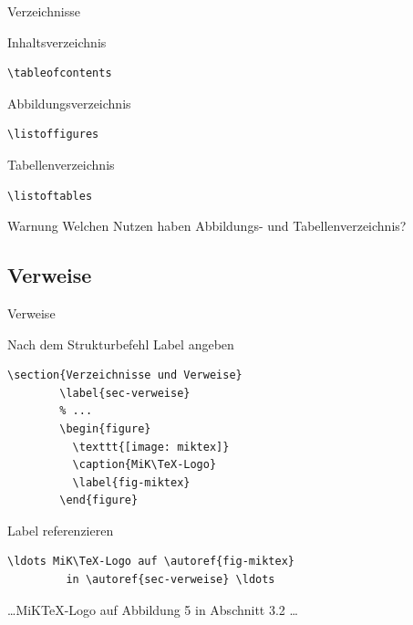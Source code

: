 \begin{Frame}[fragile]{Verzeichnisse}
  \begin{Block}{Inhaltsverzeichnis}
    \begin{lstlisting}[gobble=6,style=block]
      \tableofcontents
    \end{lstlisting}
  \end{Block}

  \begin{Block}{Abbildungsverzeichnis}
    \begin{lstlisting}[gobble=6,style=block]
      \listoffigures
    \end{lstlisting}
  \end{Block}

  \begin{Block}{Tabellenverzeichnis}
    \begin{lstlisting}[gobble=6,style=block]
      \listoftables
    \end{lstlisting}
  \end{Block}

  \xxx

  \begin{alertblock}{Warnung}
    Welchen Nutzen haben Abbildungs- und Tabellenverzeichnis?
  \end{alertblock}
\end{Frame}

\subsection{Verweise}

\begin{Frame}[fragile]{Verweise}
  \begin{looseitemize}
    \item \alert{Nach} dem Strukturbefehl Label angeben
      \begin{lstlisting}[gobble=8]
        \section{Verzeichnisse und Verweise}
        \label{sec-verweise}
        % ...
        \begin{figure}
          \texttt{[image: miktex]}
          \caption{MiK\TeX-Logo}
          \label{fig-miktex}
        \end{figure}
      \end{lstlisting}
     \item Label referenzieren
       \begin{lstlisting}[gobble=8]
         \ldots MiK\TeX-Logo auf \autoref{fig-miktex}
         in \autoref{sec-verweise} \ldots
       \end{lstlisting}
       \ldots MiK\TeX-Logo auf Abbildung 5 in Abschnitt 3.2 \ldots
  \end{looseitemize}
\end{Frame}

